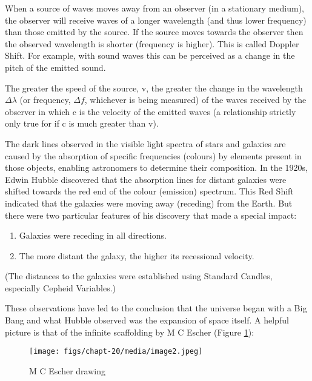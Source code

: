 \documentclass[revision-guide.tex]{subfiles}
\begin{document}
 When a source of waves moves away from an observer (in a stationary
 medium), the observer will receive waves of a longer wavelength (and
 thus lower frequency) than those emitted by the source. If the source
 moves towards the observer then the observed wavelength is shorter
 (frequency is higher). This is called Doppler Shift. For example, with
 sound waves this can be perceived as a change in the pitch of the
 emitted sound.

 The greater the speed of the source, v, the greater the change in the
 wavelength $\Delta \lambda$ (or frequency, $\Delta f$, whichever is being measured) of the
 waves received by the observer in which c is the velocity of the emitted waves (a relationship strictly
 only true for if c is much greater than v).

 The dark lines observed in the visible light spectra of stars and
 galaxies are caused by the absorption of specific frequencies (colours)
 by elements present in those objects, enabling astronomers to determine
 their composition. In the 1920s, Edwin Hubble discovered that the
 absorption lines for distant galaxies were shifted towards the red end
 of the colour (emission) spectrum. This Red Shift indicated that the
 galaxies were moving away (receding) from the Earth. But there were two
 particular features of his discovery that made a special impact:

 \begin{enumerate}
 \def\labelenumi{\alph{enumi})}
 \item
   Galaxies were receding in all directions.
 \item
   The more distant the galaxy, the higher its recessional velocity.
 \end{enumerate}

 (The distances to the galaxies were established using Standard Candles,
 especially Cepheid Variables.)


These observations have led to the conclusion that the universe began
with a Big Bang and what Hubble observed was the expansion of space
itself. A helpful picture is that of the infinite scaffolding by M C
Escher (Figure \ref{mcescher}):

\begin{figure}[h]
\begin{center}
\texttt{[image: figs/chapt-20/media/image2.jpeg]}
\end{center}
\caption{M C Escher drawing}
\label{mcescher}
\end{figure}
\end{document}
